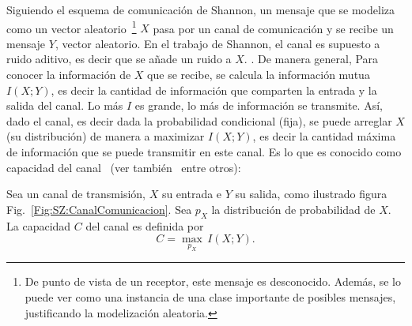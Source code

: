 
\label{Ssec:SZ:CanalCapacidad}

Siguiendo el  esquema de comunicaci\'on de  Shannon, un mensaje que  se modeliza
como  un vector  aleatorio~\footnote{De  punto  de vista  de  un receptor,  este
mensaje es  desconocido. Adem\'as,  se lo  puede ver como  una instancia  de una
clase   importante  de   posibles  mensajes,   justificando  la   modelizaci\'on
aleatoria.} $X$ pasa por un canal de  comunicaci\'on y se recibe un mensaje $Y$,
vector  aleatorio. En  el  trabajo de  Shannon,  el canal  es  supuesto a  ruido
aditivo,  es decir  que se  a\~nade  un ruido  a  $X$. .  De   manera
general, 
Para conocer la informaci\'on de $X$  que se recibe, se calcula la informaci\'on
mutua $I(X;Y)$, es decir la cantidad de informaci\'on que comparten la entrada y
la salida  del canal.   Lo m\'as  $I$ es  grande, lo  m\'as de  informaci\'on se
transmite.   As\'i, dado  el canal,  es decir  dada la  probabilidad condicional
(fija),  se  puede  arreglar  $X$  (su distribuci\'on)  de  manera  a  maximizar
$I(X;Y)$, es decir la cantidad m\'axima de informaci\'on que se puede transmitir
en   este    canal.    Es    lo   que   es    conocido   como    capacidad   del
canal~\cite[part.~II~\&~III]{Sha48} (ver  tambi\'en~\cite{CovTho06, Rio07} entre
otros):
%
\begin{definicion}
\label{Def:SZ:CapacidadCanal}
%
  Sea un canal de transmisi\'on, $X$  su entrada e $Y$ su salida, como ilustrado
  figura  Fig.~\ref{Fig:SZ:CanalComunicacion}.  Sea  $p_X$ la  distribuci\'on de
  probabilidad de $X$. La capacidad $C$ del canal es definida por
  \[
  C = \max_{p_X} \, I(X;Y).
  \]
\end{definicion}

